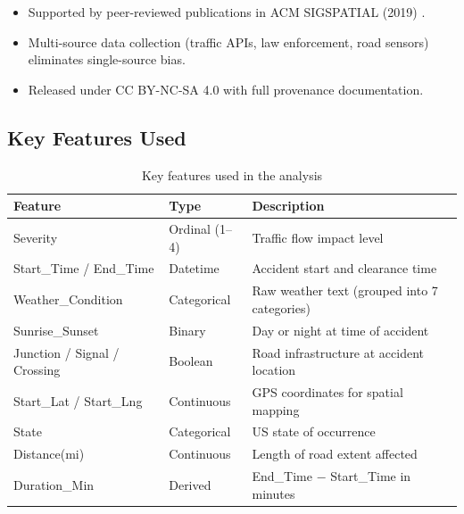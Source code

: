 \begin{itemize}[noitemsep]
  \item Supported by peer-reviewed publications in ACM SIGSPATIAL (2019)
        \cite{moosavi2019risk}.
  \item Multi-source data collection (traffic APIs, law enforcement, road
        sensors) eliminates single-source bias.
  \item Released under CC BY-NC-SA 4.0 with full provenance documentation.
\end{itemize}

\subsection*{Key Features Used}

\begin{table}[H]
\centering\small
\begin{tabular}{@{} l l p{7.5cm} @{}}
  \toprule
  \textbf{Feature}             & \textbf{Type}    & \textbf{Description} \\ \midrule
  Severity                     & Ordinal (1--4)   & Traffic flow impact level \\
  Start\_Time / End\_Time      & Datetime         & Accident start and clearance time \\
  Weather\_Condition           & Categorical      & Raw weather text (grouped into 7 categories) \\
  Sunrise\_Sunset              & Binary           & Day or night at time of accident \\
  Junction / Signal / Crossing & Boolean          & Road infrastructure at accident location \\
  Start\_Lat / Start\_Lng      & Continuous       & GPS coordinates for spatial mapping \\
  State                        & Categorical      & US state of occurrence \\
  Distance(mi)                 & Continuous       & Length of road extent affected \\
  Duration\_Min                & Derived          & End\_Time $-$ Start\_Time in minutes \\
  \bottomrule
\end{tabular}
\caption{Key features used in the analysis}
\end{table}
